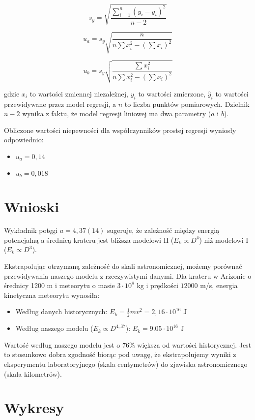 \documentclass[a4paper,12pt]{article}
\begin{document}
\[
s_y = \sqrt{\frac{\sum_{i=1}^{n} (y_i - \hat{y}_i)^2}{n-2}}
\]

\[
u_a = s_y \sqrt{\frac{n}{n \sum x_i^2 - \left( \sum x_i \right)^2}}
\]

\[
u_b = s_y \sqrt{\frac{\sum x_i^2}{n \sum x_i^2 - \left( \sum x_i \right)^2}}
\]

gdzie $x_i$ to wartości zmiennej niezależnej, $y_i$ to wartości zmierzone, $\hat{y}_i$ to wartości przewidywane przez model regresji, a $n$ to liczba punktów pomiarowych. Dzielnik $n-2$ wynika z faktu, że model regresji liniowej ma dwa parametry ($a$ i $b$).


Obliczone wartości niepewności dla współczynników prostej regresji wyniosły odpowiednio:

\begin{itemize}
    \item $u_a = 0,14$
    \item $u_b = 0,018$
\end{itemize}

\newpage

\section{Wnioski}

Wykładnik potęgi $a = 4,37(14)$ sugeruje, że zależność między energią potencjalną a średnicą krateru jest bliższa modelowi II ($E_k \propto D^4$) niż modelowi I ($E_k \propto D^3$).

Ekstrapolując otrzymaną zależność do skali astronomicznej, możemy porównać przewidywania naszego modelu z rzeczywistymi danymi. Dla krateru w Arizonie o średnicy 1200 m i meteorytu o masie $3\cdot10^8$ kg i prędkości $12000$ m/s, energia kinetyczna meteorytu wynosiła:

\begin{itemize}
    \item Według danych historycznych: $E_k = \frac{1}{2}mv^2 = 2,16\cdot10^{16} \text{ J}$
    \item Według naszego modelu ($E_k \propto D^{4,37}$): $E_k = 9.05\cdot10^{16} \text{ J}$
\end{itemize}

Wartość według naszego modelu jest o $76\%$ większa od wartości historycznej. Jest to stosunkowo dobra zgodność biorąc pod uwagę, że ekstrapolujemy wyniki z eksperymentu laboratoryjnego (skala centymetrów) do zjawiska astronomicznego (skala kilometrów).


\section{Wykresy}
\end{document}
